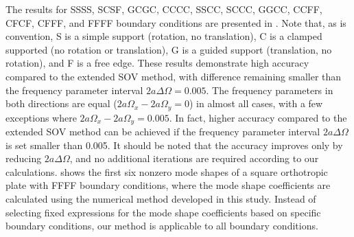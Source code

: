 \documentclass[preprint,12pt]{elsarticle}
\begin{document}
The results for SSSS, SCSF, GCGC, CCCC, SSCC, SCCC, GGCC, CCFF, CFCF, CFFF, and FFFF boundary conditions are presented in .
Note that, as is convention, S is a simple support (rotation, no translation), C is a clamped supported (no rotation or translation), G is a guided support (translation, no rotation), and F is a free edge. 
These results demonstrate high accuracy compared to the extended SOV method, with difference remaining smaller than the frequency parameter interval $2a\Delta\Omega=0.005$. 
The frequency parameters in both directions are equal ($2a\Omega_x - 2a\Omega_y = 0$) in almost all cases, with a few exceptions where $2a\Omega_x - 2a\Omega_y = 0.005$. 
In fact, higher accuracy compared to the extended SOV method can be achieved if the frequency parameter interval $2a\Delta\Omega$ is set smaller than 0.005. It should be noted that the accuracy improves only by reducing $2a\Delta\Omega$, and no additional iterations are required according to our calculations.
 shows the first six nonzero mode shapes of a square orthotropic plate with FFFF boundary conditions, where the mode shape coefficients are calculated using the numerical method developed in this study. 
Instead of selecting fixed expressions for the mode shape coefficients based on specific boundary conditions, our method is applicable to all boundary conditions.
\end{document}
